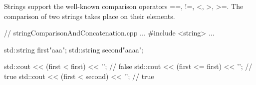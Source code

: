 Strings support the well-known comparison operators ==, !=, <, >, >=. The comparison of two strings takes place on their elements.


\begin{cpp}
// stringComparisonAndConcatenation.cpp
...
#include <string>
...

std::string first{"aaa"};
std::string second{"aaaa"};

std::cout << (first < first) << '\n'; // false
std::cout << (first <= first) << '\n'; // true
std::cout << (first < second) << '\n'; // true
\end{cpp}